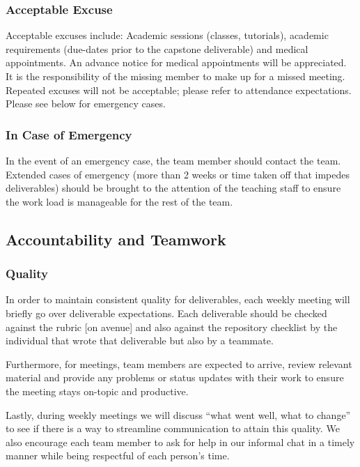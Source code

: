 \documentclass{article}
\begin{document}
\subsubsection*{Acceptable Excuse}

Acceptable excuses include: Academic sessions (classes, tutorials), academic requirements (due-dates
prior to the capstone deliverable) and medical appointments. An advance notice for medical 
appointments will be appreciated. It is the responsibility of the missing member to make up for a 
missed meeting. Repeated excuses will not be acceptable; please refer to attendance expectations. 
Please see below for emergency cases.

\subsubsection*{In Case of Emergency}

In the event of an emergency case, the team member should contact the team. Extended cases of 
emergency (more than 2 weeks or time taken off that impedes deliverables) should be brought to 
the attention of the teaching staff to ensure the work load is manageable for the rest of the team.

\subsection*{Accountability and Teamwork}

\subsubsection*{Quality} 

In order to maintain consistent quality for deliverables, each weekly meeting will briefly go over 
deliverable expectations. Each deliverable should be checked against the rubric [on avenue] and also 
against the repository checklist by the individual that wrote that deliverable but also by a teammate. 


Furthermore, for meetings, team members are expected to arrive, review relevant material and provide 
any problems or status updates with their work to ensure the meeting stays on-topic and productive.

Lastly, during weekly meetings we will discuss “what went well, what to change” to see if there is a 
way to streamline communication to attain this quality. We also encourage each team member to ask for 
help in our informal chat in a timely manner while being respectful of each person's time.
\end{document}
